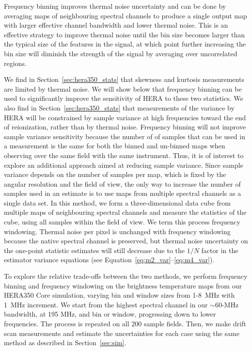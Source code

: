 \documentclass[fleqn,usenatbib]{mnras}
\begin{document}
Frequency binning improves thermal noise uncertainty and can be done by averaging maps of neighbouring spectral channels to produce a single output map with larger effective channel bandwidth and lower thermal noise.   This is an effective strategy to improve thermal noise until the bin size becomes larger than the typical size of the features in the signal, at which point further increasing the bin size will diminish the strength of the signal by averaging over uncorrelated regions. 

We find in Section~\ref{sec:hera350_stats} that skewness and kurtosis measurements are limited by thermal noise. We will show below that frequency binning can be used to significantly improve the sensitivity of HERA to these two statistics.  We also find in Section~\ref{sec:hera350_stats} that measurements of the variance by HERA will be constrained by sample variance at high frequencies toward the end of reionization, rather than by thermal noise. Frequency binning will not improve sample variance sensitivity because the number of of samples that can be used in a measurement is the same for both the binned and un-binned maps when observing over the same field with the same instrument. Thus, it is of interest to explore an additional approach aimed at reducing sample variance. Since sample variance depends on the number of samples per map, which is fixed by the angular resolution and the field of view, the only way to increase the number of samples used in an estimate is to use maps from multiple spectral channels as a single data set. In this method, we form a three-dimensional data cube from multiple maps of neighbouring spectral channels and measure the statistics of the cube, using all samples within the field of view. We term this process frequency windowing. Thermal noise per pixel is unchanged with frequency windowing because the native spectral channel is preserved, but thermal noise uncertainty on the one-point statistic estimates will still decrease due to the  $1/N$ factor in the estimator variance equations (see Equation~\ref{eq:m2_var}--\ref{eq:m4_var}).  

To explore the relative trade-offs between the two methods, we perform frequency binning and frequency windowing on the brightness temperature maps from our HERA350 Core simulation, varying bin and window sizes from 1-8~MHz with 1~MHz increment. We start from the highest spectral channel in our $\sim$60-MHz bandwidth, at 195 MHz, and bin or window, progressing down to lower frequencies. The process is repeated on all 200 sample fields. Then, we make drift scan measurements and estimate the uncertainties for each case using the same method as described in Section~\ref{sec:sim}.
\end{document}
